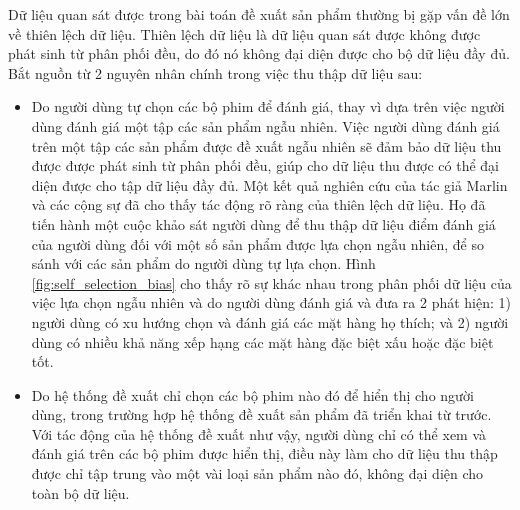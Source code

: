Dữ liệu quan sát được trong bài toán đề xuất sản phẩm thường bị gặp vấn đề lớn về thiên lệch dữ liệu. Thiên lệch dữ liệu là dữ liệu quan sát được không được phát sinh từ phân phối đều, do đó nó không đại diện được cho bộ dữ liệu đầy đủ. Bắt nguồn từ 2 nguyên nhân chính trong việc thu thập dữ liệu sau:
\begin{itemize}
    \item Do người dùng tự chọn các bộ phim để đánh giá, thay vì dựa trên việc người dùng đánh giá một tập các sản phẩm ngẫu nhiên.
    Việc người dùng đánh giá trên một tập các sản phẩm được đề xuất ngẫu nhiên sẽ đảm bảo dữ liệu thu được được phát sinh từ phân phối đều, giúp cho dữ liệu thu được có thể đại diện được cho tập dữ liệu đầy đủ.
    Một kết quả nghiên cứu của tác giả Marlin và các cộng sự \cite{bias} đã cho thấy tác động rõ ràng của thiên lệch dữ liệu. Họ đã tiến hành một cuộc khảo sát người dùng để thu thập dữ liệu điểm đánh giá của người dùng đối với một số sản phẩm được lựa chọn ngẫu nhiên, để so sánh với các sản phẩm do người dùng tự lựa chọn. Hình \ref{fig:self_selection_bias} cho thấy rõ sự khác nhau trong phân phối dữ liệu của việc lựa chọn ngẫu nhiên và do người dùng đánh giá và đưa ra 2 phát hiện: 1) người dùng có xu hướng chọn và đánh giá các mặt hàng họ thích; và 2) người dùng có nhiều khả năng xếp hạng các mặt hàng đặc biệt xấu hoặc đặc biệt tốt.
    \item Do hệ thống đề xuất chỉ chọn các bộ phim nào đó để hiển thị cho người dùng, trong trường hợp hệ thống đề xuất sản phẩm đã triển khai từ trước. Với tác động của hệ thống đề xuất như vậy, người dùng chỉ có thể xem và đánh giá trên các bộ phim được hiển thị, điều này làm cho dữ liệu thu thập được chỉ tập trung vào một vài loại sản phẩm nào đó, không đại diện cho toàn bộ dữ liệu.
\end{itemize}

